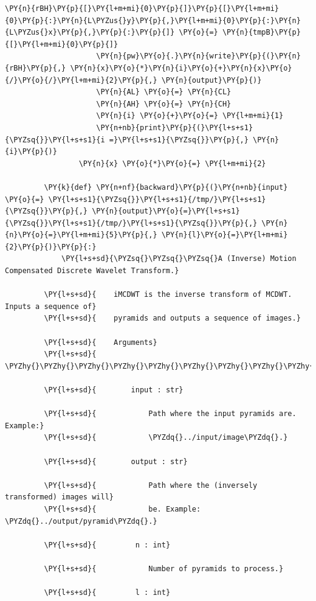 \begin{Verbatim}[commandchars=\\\{\}]
                     \PY{n}{rBH}\PY{p}{[}\PY{l+m+mi}{0}\PY{p}{]}\PY{p}{[}\PY{l+m+mi}{0}\PY{p}{:}\PY{n}{L\PYZus{}y}\PY{p}{,}\PY{l+m+mi}{0}\PY{p}{:}\PY{n}{L\PYZus{}x}\PY{p}{,}\PY{p}{:}\PY{p}{]} \PY{o}{=} \PY{n}{tmpB}\PY{p}{[}\PY{l+m+mi}{0}\PY{p}{]}
                     \PY{n}{pw}\PY{o}{.}\PY{n}{write}\PY{p}{(}\PY{n}{rBH}\PY{p}{,} \PY{n}{x}\PY{o}{*}\PY{n}{i}\PY{o}{+}\PY{n}{x}\PY{o}{/}\PY{o}{/}\PY{l+m+mi}{2}\PY{p}{,} \PY{n}{output}\PY{p}{)}
                     \PY{n}{AL} \PY{o}{=} \PY{n}{CL}
                     \PY{n}{AH} \PY{o}{=} \PY{n}{CH}
                     \PY{n}{i} \PY{o}{+}\PY{o}{=} \PY{l+m+mi}{1}
                     \PY{n+nb}{print}\PY{p}{(}\PY{l+s+s1}{\PYZsq{}}\PY{l+s+s1}{i =}\PY{l+s+s1}{\PYZsq{}}\PY{p}{,} \PY{n}{i}\PY{p}{)}
                 \PY{n}{x} \PY{o}{*}\PY{o}{=} \PY{l+m+mi}{2}
         
         \PY{k}{def} \PY{n+nf}{backward}\PY{p}{(}\PY{n+nb}{input} \PY{o}{=} \PY{l+s+s1}{\PYZsq{}}\PY{l+s+s1}{/tmp/}\PY{l+s+s1}{\PYZsq{}}\PY{p}{,} \PY{n}{output}\PY{o}{=}\PY{l+s+s1}{\PYZsq{}}\PY{l+s+s1}{/tmp/}\PY{l+s+s1}{\PYZsq{}}\PY{p}{,} \PY{n}{n}\PY{o}{=}\PY{l+m+mi}{5}\PY{p}{,} \PY{n}{l}\PY{o}{=}\PY{l+m+mi}{2}\PY{p}{)}\PY{p}{:}
             \PY{l+s+sd}{\PYZsq{}\PYZsq{}\PYZsq{}A (Inverse) Motion Compensated Discrete Wavelet Transform.}
         
         \PY{l+s+sd}{    iMCDWT is the inverse transform of MCDWT. Inputs a sequence of}
         \PY{l+s+sd}{    pyramids and outputs a sequence of images.}
         
         \PY{l+s+sd}{    Arguments}
         \PY{l+s+sd}{    \PYZhy{}\PYZhy{}\PYZhy{}\PYZhy{}\PYZhy{}\PYZhy{}\PYZhy{}\PYZhy{}\PYZhy{}}
         
         \PY{l+s+sd}{        input : str}
         
         \PY{l+s+sd}{            Path where the input pyramids are. Example:}
         \PY{l+s+sd}{            \PYZdq{}../input/image\PYZdq{}.}
         
         \PY{l+s+sd}{        output : str}
         
         \PY{l+s+sd}{            Path where the (inversely transformed) images will}
         \PY{l+s+sd}{            be. Example: \PYZdq{}../output/pyramid\PYZdq{}.}
         
         \PY{l+s+sd}{         n : int}
         
         \PY{l+s+sd}{            Number of pyramids to process.}
         
         \PY{l+s+sd}{         l : int}
         

\end{Verbatim}
